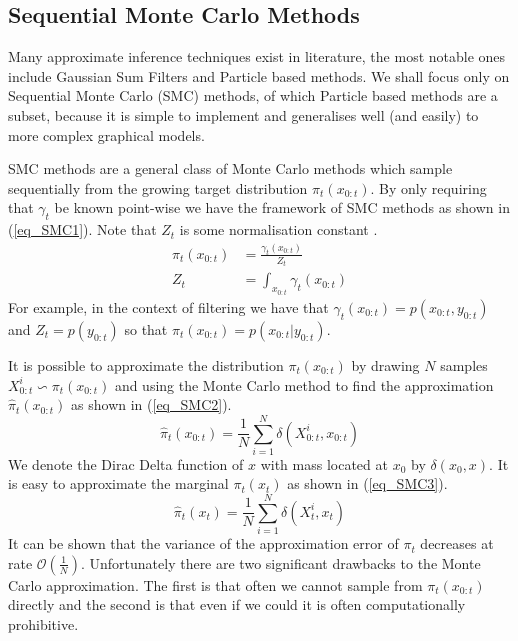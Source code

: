 \subsection{Sequential Monte Carlo Methods}
Many approximate inference techniques exist in literature, the most notable ones include Gaussian Sum Filters \cite{gsf1} and Particle based methods. We shall focus only on Sequential Monte Carlo (SMC) methods, of which Particle based methods are a subset, because it is simple to implement and generalises well (and easily) to more complex graphical models. 

SMC methods are a general class of Monte Carlo methods which sample sequentially from the growing target distribution $\pi_t(x_{0:t})$. By only requiring that $\gamma_t$ be known point-wise we have the framework of SMC methods as shown in (\ref{eq_SMC1}). Note that $Z_t$ is some normalisation constant \cite{pftut}.
\begin{equation}
\begin{aligned}
\pi_t(x_{0:t}) &= \frac{\gamma_t(x_{0:t})}{Z_t} \\
Z_t &= \int_{x_{0:t}} \gamma_t(x_{0:t})
\end{aligned}
\label{eq_SMC1}
\end{equation} 
For example, in the context of filtering we have that $\gamma_t(x_{0:t}) = p(x_{0:t},y_{0:t})$ and $Z_t = p(y_{0:t})$ so that $\pi_t(x_{0:t}) = p(x_{0:t}|y_{0:t})$. 

It is possible to approximate the distribution $\pi_t(x_{0:t})$ by drawing $N$ samples $X_{0:t}^i \backsim \pi_t(x_{0:t})$ and using the Monte Carlo method to find the approximation $\hat{\pi}_t(x_{0:t})$ as shown in (\ref{eq_SMC2}).
\begin{equation}
\hat{\pi}_t(x_{0:t}) = \frac{1}{N}\sum_{i=1}^N \delta(X^i_{0:t}, x_{0:t})
\label{eq_SMC2}
\end{equation}
We denote the Dirac Delta function of $x$ with mass located at $x_0$ by $\delta(x_0,x)$. It is easy to approximate the marginal $\pi_t(x_{t})$ as shown in (\ref{eq_SMC3}).
\begin{equation}
\hat{\pi}_t(x_{t}) = \frac{1}{N}\sum_{i=1}^N \delta(X^i_{t}, x_{t})
\label{eq_SMC3}
\end{equation}
It can be shown that the variance of the approximation error of $\pi_t$ decreases at rate $\mathcal{O}(\frac{1}{N})$. Unfortunately there are two significant drawbacks to the Monte Carlo approximation. The first is that often we cannot sample from $\pi_t(x_{0:t})$ directly and the second is that even if we could it is often computationally prohibitive. 

